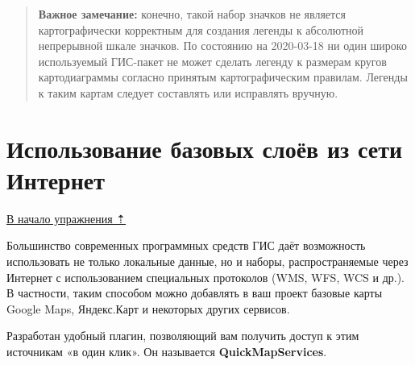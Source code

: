 \documentclass[
  12pt,
]{book}
\begin{document}
\begin{enumerate}
  \begin{quote}
  \textbf{Важное замечание:} конечно, такой набор значков не является картографически корректным для создания легенды к абсолютной непрерывной шкале значков. По состоянию на 2020-03-18 ни один широко используемый ГИС-пакет не может сделать легенду к размерам кругов картодиаграммы согласно принятым картографическим правилам. Легенды к таким картам следует составлять или исправлять вручную.
  \end{quote}
\end{enumerate}

\hypertarget{map-ref-districts-wms}{%
\section{Использование базовых слоёв из сети Интернет}\label{map-ref-districts-wms}}

\protect\hyperlink{map-ref-districts}{В начало упражнения ⇡}

Большинство современных программных средств ГИС даёт возможность использовать не только локальные данные, но и наборы, распространяемые через Интернет с использованием специальных протоколов (WMS, WFS, WCS и др.). В частности, таким способом можно добавлять в ваш проект базовые карты Google Maps, Яндекс.Карт и некоторых других сервисов.

Разработан удобный плагин, позволяющий вам получить доступ к этим источникам «в один клик». Он называется \textbf{QuickMapServices}.
\end{document}
